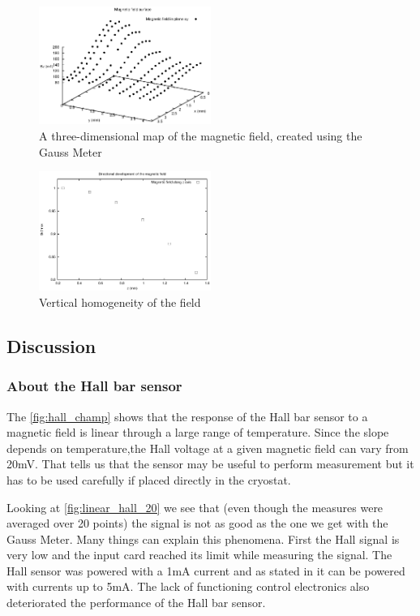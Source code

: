\documentclass[journal,a4paper]{IEEEtran}
\begin{document}
\begin{figure}[h]
\centering

\includegraphics[width=0.5\textwidth]{cartographie_champ.eps}
\caption{A three-dimensional map of the magnetic field, created using the Gauss Meter}
\label{fig:map}
\end{figure}

\begin{figure}[h]
\centering

\includegraphics[width=0.5\textwidth]{cartographie_champ_z.eps}
\caption{Vertical homogeneity of the field}
\label{fig:homo_z}
\end{figure}

\subsection{Discussion}

\subsubsection{About the Hall bar sensor}

The \figurename \ref{fig:hall_champ} shows that the response of the Hall bar sensor to a magnetic field is linear through a large range of temperature. Since the slope depends on temperature,the Hall voltage at a given magnetic field can vary from 20mV. That tells us that the sensor may be useful to perform measurement but it has to be used carefully if placed directly in the cryostat.

Looking at \figurename \ref{fig:linear_hall_20} we see that (even though the measures were averaged over 20 points) the signal is not as good as the one we get with the Gauss Meter. Many things can explain this phenomena. First the Hall signal is very low and the input card reached its limit while measuring the signal. The Hall sensor was powered with a 1mA current and as stated in \cite{toshiba} it can be powered with currents up to 5mA. The lack of functioning control electronics also deteriorated the performance of the Hall bar sensor. 
\end{document}

